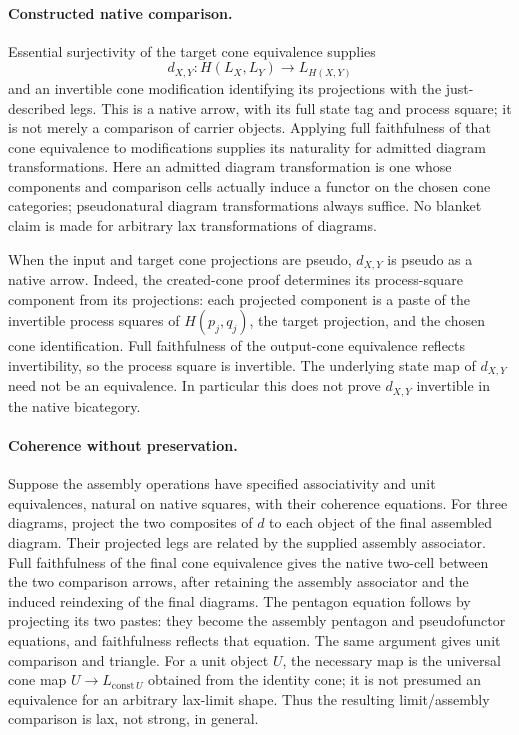 \documentclass{article}
\begin{document}
\paragraph{Constructed native comparison.} Essential surjectivity of the target cone equivalence supplies
\[
 d_{X,Y}:H(L_X,L_Y)\longrightarrow L_{H(X,Y)}
\]
and an invertible cone modification identifying its projections with the just-described legs. This is a native arrow, with its full state tag and process square; it is not merely a comparison of carrier objects. Applying full faithfulness of that cone equivalence to modifications supplies its naturality for admitted diagram transformations. Here an admitted diagram transformation is one whose components and comparison cells actually induce a functor on the chosen cone categories; pseudonatural diagram transformations always suffice. No blanket claim is made for arbitrary lax transformations of diagrams.

When the input and target cone projections are pseudo, $d_{X,Y}$ is pseudo as a native arrow. Indeed, the created-cone proof determines its process-square component from its projections: each projected component is a paste of the invertible process squares of $H(p_j,q_j)$, the target projection, and the chosen cone identification. Full faithfulness of the output-cone equivalence reflects invertibility, so the process square is invertible. The underlying state map of $d_{X,Y}$ need not be an equivalence. In particular this does not prove $d_{X,Y}$ invertible in the native bicategory.

\paragraph{Coherence without preservation.} Suppose the assembly operations have specified associativity and unit equivalences, natural on native squares, with their coherence equations. For three diagrams, project the two composites of $d$ to each object of the final assembled diagram. Their projected legs are related by the supplied assembly associator. Full faithfulness of the final cone equivalence gives the native two-cell between the two comparison arrows, after retaining the assembly associator and the induced reindexing of the final diagrams. The pentagon equation follows by projecting its two pastes: they become the assembly pentagon and pseudofunctor equations, and faithfulness reflects that equation. The same argument gives unit comparison and triangle. For a unit object $U$, the necessary map is the universal cone map $U\to L_{\mathrm{const}\,U}$ obtained from the identity cone; it is not presumed an equivalence for an arbitrary lax-limit shape. Thus the resulting limit/assembly comparison is lax, not strong, in general.
\end{document}

